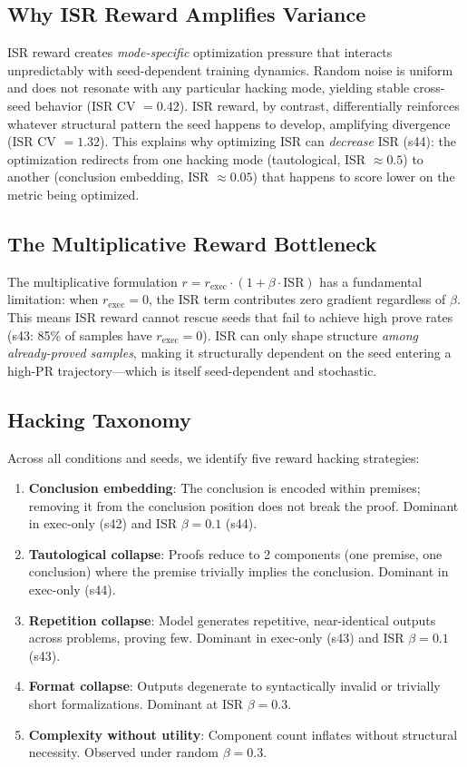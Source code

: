 \documentclass[11pt,a4paper]{article}
\begin{document}
\subsection{Why ISR Reward Amplifies Variance}

ISR reward creates \emph{mode-specific} optimization pressure that interacts unpredictably with seed-dependent training dynamics.
Random noise is uniform and does not resonate with any particular hacking mode, yielding stable cross-seed behavior (ISR CV $= 0.42$).
ISR reward, by contrast, differentially reinforces whatever structural pattern the seed happens to develop, amplifying divergence (ISR CV $= 1.32$).
This explains why optimizing ISR can \emph{decrease} ISR (s44): the optimization redirects from one hacking mode (tautological, ISR $\approx 0.5$) to another (conclusion embedding, ISR $\approx 0.05$) that happens to score lower on the metric being optimized.

\subsection{The Multiplicative Reward Bottleneck}

The multiplicative formulation $r = r_{\text{exec}} \cdot (1 + \beta \cdot \text{ISR})$ has a fundamental limitation: when $r_{\text{exec}} = 0$, the ISR term contributes zero gradient regardless of $\beta$.
This means ISR reward cannot rescue seeds that fail to achieve high prove rates (s43: 85\% of samples have $r_{\text{exec}} = 0$).
ISR can only shape structure \emph{among already-proved samples}, making it structurally dependent on the seed entering a high-PR trajectory---which is itself seed-dependent and stochastic.

\subsection{Hacking Taxonomy}

Across all conditions and seeds, we identify five reward hacking strategies:

\begin{enumerate}
\item \textbf{Conclusion embedding}: The conclusion is encoded within premises; removing it from the conclusion position does not break the proof. Dominant in exec-only (s42) and ISR $\beta{=}0.1$ (s44).
\item \textbf{Tautological collapse}: Proofs reduce to 2 components (one premise, one conclusion) where the premise trivially implies the conclusion. Dominant in exec-only (s44).
\item \textbf{Repetition collapse}: Model generates repetitive, near-identical outputs across problems, proving few. Dominant in exec-only (s43) and ISR $\beta{=}0.1$ (s43).
\item \textbf{Format collapse}: Outputs degenerate to syntactically invalid or trivially short formalizations. Dominant at ISR $\beta{=}0.3$.
\item \textbf{Complexity without utility}: Component count inflates without structural necessity. Observed under random $\beta{=}0.3$.
\end{enumerate}
\end{document}

